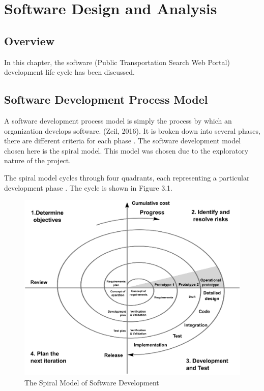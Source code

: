 
\chapter{Software Design and Analysis} %



\ifpdf
    \graphicspath{{3/figures/PNG/}{3/figures/PDF/}{3/figures/}}
\else
    \graphicspath{{3/figures/EPS/}{3/figures/}}
\fi

\section{Overview}
In this chapter, the software (Public Transportation Search Web Portal) development life cycle has been discussed.

\section{Software Development Process Model}
A software development process model is simply the process by which an organization 
develops software. (Zeil, 2016). It is broken down into several phases, there are different criteria for each phase \citep{marciniak1994encyclopedia}. The software development model chosen here is the spiral model. This model was chosen due to the exploratory nature of the project.

The spiral model cycles through four quadrants, each representing a particular development phase \cite{boehm_spiral_1988}. The cycle is shown in Figure 3.1.

\begin{figure}[th!]
	\centering
	\includegraphics[width=1.0\textwidth]{spiral}
	\caption[The Spiral Model of Software Development]{The Spiral Model of Software Development}
	\label{fig:spiral}
\end{figure}

